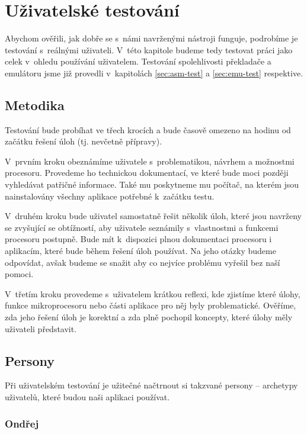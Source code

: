 \chapter{Uživatelské testování}

Abychom ověřili, jak dobře se s~námi navrženými nástroji funguje, podrobíme je testování s~reálnými uživateli. V~této kapitole budeme tedy testovat práci jako celek v~ohledu používání uživatelem. Testování spolehlivosti překladače a emulátoru jsme již provedli v~kapitolách \ref{sec:asm-test} a \ref{sec:emu-test} respektive.

\section{Metodika}

Testování bude probíhat ve třech krocích a bude časově omezeno na hodinu od začátku řešení úloh (tj. nevčetně přípravy).

V~prvním kroku obeznámíme uživatele s~problematikou, návrhem a mož\-nost\-mi procesoru. Provedeme ho technickou dokumentací, ve které bude moci později vyhledávat patřičné informace. Také mu poskytneme mu počítač, na kterém jsou nainstalovány všechny aplikace potřebné k~začátku testu.

V~druhém kroku bude uživatel samostatně řešit několik úloh, které jsou navrženy se zvyšující se obtížností, aby uživatele seznámily s~vlastnostmi a funkcemi procesoru postupně. Bude mít k~dispozici plnou dokumentaci procesoru i aplikacím, které bude během řešení úloh používat. Na jeho otázky budeme odpovídat, avšak budeme se snažit aby co nejvíce problému vyřešil bez naší pomoci.

V~třetím kroku provedeme s~uživatelem krátkou reflexi, kde zjistíme které úlohy, funkce mikroprocesoru nebo části aplikace pro něj byly problematické. Ověříme, zda jeho řešení úloh je korektní a zda plně pochopil koncepty, které úlohy měly uživateli představit.

\section{Persony}

Při uživatelském testování je užitečné načtrnout si takzvané persony -- archetypy uživatelů, které budou naši aplikaci používat.

\subsection{Ondřej}
\label{persona:a}

